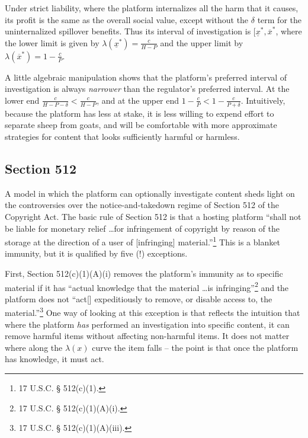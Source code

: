 Under strict liability, where the platform internalizes all the harm that it causes, its profit is the same as the overall social value, except without the $\delta$ term for the uninternalized spillover benefits. Thus its interval of investigation is $[\underline{x}^*, \overline{x}^*$, where the lower limit  is given by $\lambda(\underline{x}^*) = \frac{c}{H - P} $ and the upper limit by $\lambda(\overline{x}^*) = 1 - \frac{c}{P}$.

A little algebraic manipulation shows that the platform's preferred interval of investigation is always \emph{narrower} than the regulator's preferred interval. At the lower end $\frac{c}{H - P - \delta} < \frac{c}{H - P}$, and at the upper end $1 - \frac{c}{P} < 1 - \frac{c}{P + \delta}$. Intuitively, because the platform has less at stake, it is less willing to expend effort to separate sheep from goats, and will be comfortable with more approximate strategies for content that looks sufficiently harmful or harmless.


\subsection{Section 512}

A model in which the platform can optionally investigate content sheds light on the controversies over the notice-and-takedown regime of Section 512 of the Copyright Act. The basic rule of Section 512 is that a hosting platform ``shall not be liable for monetary relief \ldots for infringement of copyright by reason of the storage at the direction of a user of [infringing] material.''\footnote{17 U.S.C. § 512(c)(1).} This is a blanket immunity, but it is qualified by five (!) exceptions.

First, Section 512(c)(1)(A)(i) removes the platform's immunity as to specific material if it has ``actual knowledge that the material \ldots is infringing''\footnote{17 U.S.C. § 512(c)(1)(A)(i).} and the platform does not ``act[] expeditiously to remove, or disable access to, the material.''\footnote{17 U.S.C. § 512(c)(1)(A)(iii).} One way of looking at this exception is that reflects the intuition that where the platform \emph{has} performed an investigation into specific content, it can remove harmful items without affecting non-harmful items. It does not matter where along the $\lambda(x)$ curve the item falls -- the point is that once the platform has knowledge, it must act. 

